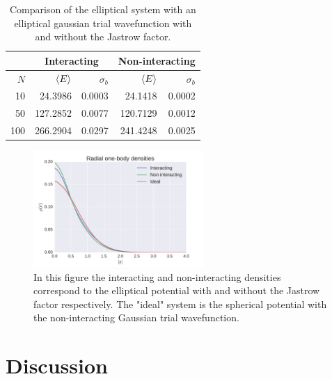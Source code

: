 \documentclass[
    a4paper, aps, twocolumn, floatfix, superscriptaddress,
    nofootinbib]{revtex4-1}
\newcommand{\1}{\mathds{1}}
\begin{document}
            \begin{table}
                \caption{Comparison of the elliptical system with an elliptical
                gaussian trial wavefunction with and without the Jastrow
                factor.}
                \centering
                \begin{ruledtabular}
                    \begin{tabular}{r|rr|rr}
                        & \multicolumn{2}{c|}{Interacting}
                        & \multicolumn{2}{c}{Non-interacting} \\
                        \hline
                        $N$ & $\expval{E}$ & $\sigma_b$ & $\expval{E}$
                        & $\sigma_b$ \\
                        \hline
                        10 & 24.3986 & 0.0003 & 24.1418 & 0.0002 \\
                        50 & 127.2852 & 0.0077 & 120.7129 & 0.0012 \\
                        100 & 266.2904 & 0.0297 & 241.4248 & 0.0025
                    \end{tabular}
                \end{ruledtabular}
                \label{tab:10_optimal}
            \end{table}

            \begin{figure}
                \includegraphics[width=244px]
                {../data/figures/problem_g_100N.pdf}
                \caption{In this figure the interacting and non-interacting
                densities correspond to the elliptical potential with and
                without the Jastrow factor respectively. The "ideal" system is
                the spherical potential with the non-interacting Gaussian trial
                wavefunction.}
                \label{fig:one_body_density_100}
            \end{figure}


\section{Discussion}
\end{document}
